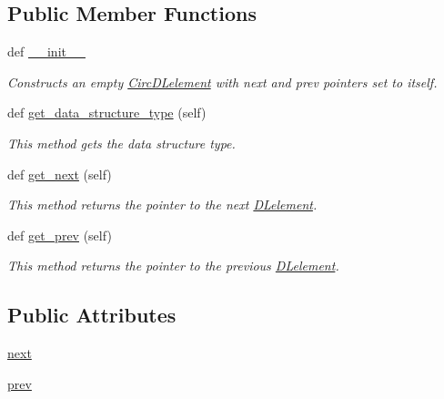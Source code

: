 \subsection*{Public Member Functions}
\begin{DoxyCompactItemize}
\item 
def \hyperlink{class_bridges_1_1_circ_d_lelement_1_1_circ_d_lelement_a48a58c226d5d85a3bcce77e974bb78d3}{\+\_\+\+\_\+init\+\_\+\+\_\+}
\begin{DoxyCompactList}\small\item\em Constructs an empty \hyperlink{class_bridges_1_1_circ_d_lelement_1_1_circ_d_lelement}{Circ\+D\+Lelement} with next and prev pointers set to itself. \end{DoxyCompactList}\item 
def \hyperlink{class_bridges_1_1_circ_d_lelement_1_1_circ_d_lelement_a00595fd201fbbe870c524efd02c53b83}{get\+\_\+data\+\_\+structure\+\_\+type} (self)
\begin{DoxyCompactList}\small\item\em This method gets the data structure type. \end{DoxyCompactList}\item 
def \hyperlink{class_bridges_1_1_circ_d_lelement_1_1_circ_d_lelement_aa5ee07b40eed6b8528d4dcae0bbd7dd1}{get\+\_\+next} (self)
\begin{DoxyCompactList}\small\item\em This method returns the pointer to the next \hyperlink{namespace_bridges_1_1_d_lelement}{D\+Lelement}. \end{DoxyCompactList}\item 
def \hyperlink{class_bridges_1_1_circ_d_lelement_1_1_circ_d_lelement_ada3069ef0cf2cf2960b5b87036ba66dd}{get\+\_\+prev} (self)
\begin{DoxyCompactList}\small\item\em This method returns the pointer to the previous \hyperlink{namespace_bridges_1_1_d_lelement}{D\+Lelement}. \end{DoxyCompactList}\end{DoxyCompactItemize}
\subsection*{Public Attributes}
\begin{DoxyCompactItemize}
\item 
\hyperlink{class_bridges_1_1_circ_d_lelement_1_1_circ_d_lelement_af101cccf9d2c5c2027b7d812034bc262}{next}
\item 
\hyperlink{class_bridges_1_1_circ_d_lelement_1_1_circ_d_lelement_a4aee631669271013ced8cd8d677ca812}{prev}
\end{DoxyCompactItemize}
